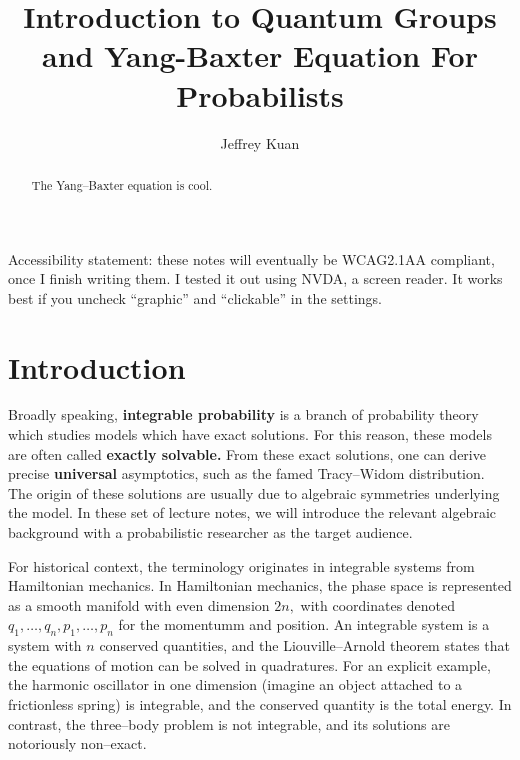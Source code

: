 \documentclass{ximera}
\author{Jeffrey Kuan}
\title{Introduction to Quantum Groups and Yang-Baxter Equation For Probabilists}
\begin{document}
\begin{abstract}
   The Yang--Baxter equation is cool. 
\end{abstract}
\maketitle


Accessibility statement: these notes will eventually be WCAG2.1AA compliant, once I finish writing them. I tested it out using NVDA, a screen reader.
It works best if you uncheck ``graphic'' and ``clickable'' in the settings. 


\section{Introduction}

Broadly speaking, \textbf{integrable probability} is a branch of probability theory which studies 
models which have exact solutions. For this reason, these models are often called \textbf{exactly solvable.}
From these exact solutions, one can derive precise \textbf{universal} asymptotics, such as the 
famed Tracy--Widom distribution. The origin of these solutions are usually due to algebraic symmetries 
underlying the model. In these set of lecture notes, we will introduce the relevant algebraic background
with a probabilistic researcher as the target audience. 

For historical context, the terminology originates in integrable systems from Hamiltonian mechanics.
In Hamiltonian mechanics, the phase space is represented as a smooth manifold with even dimension $2n,$
with coordinates denoted $q_1,\ldots,q_n,p_1,\ldots,p_n$ for the momentumm and position. An integrable
system is a system with $n$ conserved quantities, and the Liouville--Arnold theorem states that the 
equations of motion can be solved in quadratures. For an explicit example, the harmonic oscillator in 
one dimension (imagine an object attached to a frictionless spring) is integrable, and the conserved quantity
is the total energy. In contrast, the three--body problem is not integrable, and its solutions are 
notoriously non--exact. 
\end{document}
